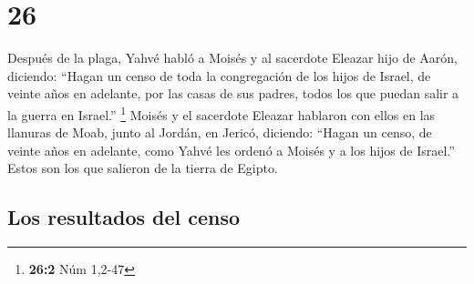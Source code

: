 \hypertarget{section-25}{%
\section{26}\label{section-25}}

 Después de la plaga, Yahvé habló a Moisés y al sacerdote
Eleazar hijo de Aarón, diciendo:  ``Hagan un censo de toda
la congregación de los hijos de Israel, de veinte años en adelante, por
las casas de sus padres, todos los que puedan salir a la guerra en
Israel.'' \footnote{\textbf{26:2} Núm 1,2-47}  Moisés y el
sacerdote Eleazar hablaron con ellos en las llanuras de Moab, junto al
Jordán, en Jericó, diciendo:  ``Hagan un censo, de veinte
años en adelante, como Yahvé les ordenó a Moisés y a los hijos de
Israel.'' Estos son los que salieron de la tierra de Egipto.

\hypertarget{los-resultados-del-censo-1}{%
\subsection{Los resultados del censo}\label{los-resultados-del-censo-1}}

